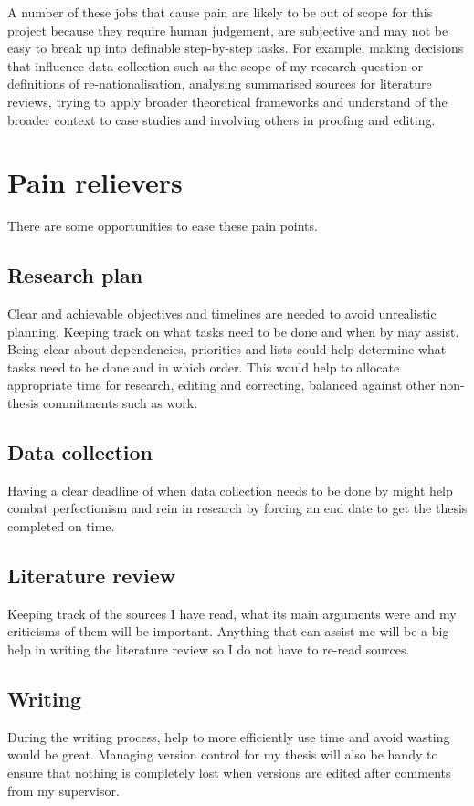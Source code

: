 \documentclass{article}
\begin{document}
A number of these jobs that cause pain are likely to be out of scope for this project because they require human judgement, are subjective and may not be easy to break up into definable step-by-step tasks. For example, making decisions that influence data collection such as the scope of my research question or definitions of re-nationalisation, analysing summarised sources for literature reviews, trying to apply broader theoretical frameworks and understand of the broader context to case studies and involving others in proofing and editing.

\section*{Pain relievers}

There are some opportunities to ease these pain points.\par
\subsection*{Research plan}
Clear and achievable objectives and timelines are needed to avoid unrealistic planning. Keeping track on what tasks need to be done and when by may assist. Being clear about dependencies, priorities and lists could help determine what tasks need to be done and in which order. This would help to allocate appropriate time for research, editing and correcting, balanced against other non-thesis commitments such as work.
\subsection*{Data collection}
Having a clear deadline of when data collection needs to be done by might help combat perfectionism and rein in research by forcing an end date to get the thesis completed on time. 
\subsection*{Literature review}
Keeping track of the sources I have read, what its main arguments were and my criticisms of them will be important. Anything that can assist me will be a big help in writing the literature review so I do not have to re-read sources. 
\subsection*{Writing}
During the writing process, help to more efficiently use time and avoid wasting would be great. Managing version control for my thesis will also be handy to ensure that nothing is completely lost when versions are edited after comments from my supervisor.\par
\end{document}
